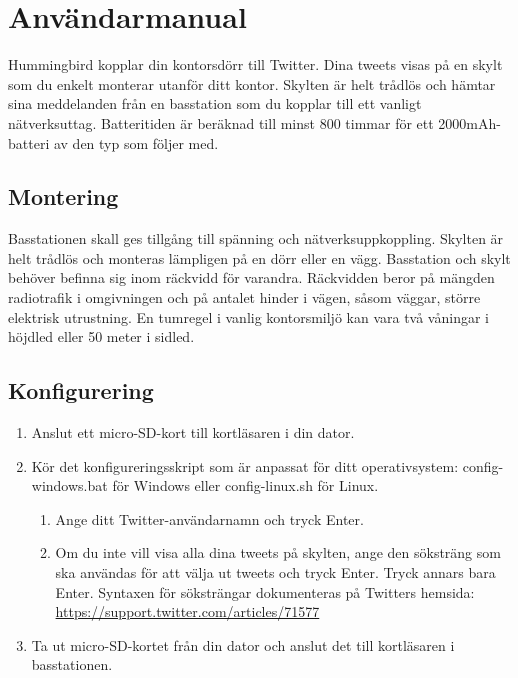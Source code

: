 \documentclass[a4paper,11pt]{article}
\begin{document}
\section{Användarmanual}

Hummingbird kopplar din kontorsdörr till Twitter. Dina tweets visas på en skylt som du enkelt monterar utanför ditt kontor. Skylten är helt trådlös och hämtar sina meddelanden från en basstation som du kopplar till ett vanligt nätverksuttag. Batteritiden är beräknad till minst 800 timmar för ett 2000mAh-batteri av den typ som följer med.

\subsection{Montering}
Basstationen skall ges tillgång till spänning och nätverksuppkoppling. Skylten är helt trådlös och monteras lämpligen på en dörr eller en vägg. Basstation och skylt behöver befinna sig inom räckvidd för varandra. Räckvidden beror på mängden radiotrafik i omgivningen och på antalet hinder i vägen, såsom väggar, större elektrisk utrustning. En tumregel i vanlig kontorsmiljö kan vara två våningar i höjdled eller 50 meter i sidled.

\subsection{Konfigurering}

\begin{enumerate}
    \item Anslut ett micro-SD-kort till kortläsaren i din dator.
    \item Kör det konfigureringsskript som är anpassat för ditt operativsystem: config-windows.bat för Windows eller config-linux.sh för Linux.
    \begin{enumerate}
        \item Ange ditt Twitter-användarnamn och tryck Enter.
        \item Om du inte vill visa alla dina tweets på skylten, ange den söksträng som ska användas för att välja ut tweets och tryck Enter. Tryck annars bara Enter. Syntaxen för söksträngar dokumenteras på Twitters hemsida: \url{https://support.twitter.com/articles/71577}
    \end{enumerate}
    \item Ta ut micro-SD-kortet från din dator och anslut det till kortläsaren i basstationen.
\end{enumerate}
\end{document}
